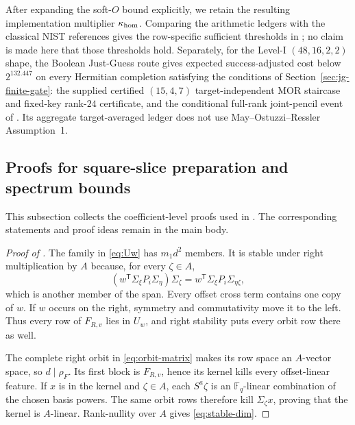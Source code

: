 \documentclass[11pt]{article}
\newcommand{\F}{\mathbb F}
\newcommand{\transpose}{\mathsf T}
\begin{document}
After expanding the soft-$O$ bound explicitly, we retain the resulting
implementation multiplier $\kappa_{\rm hom}$.  Comparing the arithmetic
ledgers with the classical NIST references gives
the row-specific sufficient thresholds in ; no claim is
made here that those thresholds hold.  Separately, for the Level-I $(48,16,2,2)$ shape, the Boolean Just-Guess
route gives expected success-adjusted cost below $2^{132.447}$ on every
Hermitian completion satisfying the conditions of Section~\ref{sec:jg-finite-gate}: the supplied certified $(15,4,7)$ target-independent MOR staircase and fixed-key rank-$24$ certificate,
and the conditional full-rank joint-pencil event of .  Its aggregate target-averaged ledger
does not use May--Ostuzzi--Ressler Assumption~1.

\subsection{Proofs for square-slice preparation and spectrum bounds}
\label{app:slice-proofs}

This subsection collects the coefficient-level proofs used in
.  The corresponding
statements and proof ideas remain in the main body.

\begin{proof}[Proof of ]
The family in \eqref{eq:Uw} has $m_1d^2$ members.  It is stable under right
multiplication by $A$ because, for every $\zeta\in A$,
\[
 (w^\transpose\Sigma_\xi P_i\Sigma_\eta)\Sigma_\zeta
 =w^\transpose\Sigma_\xi P_i\Sigma_{\eta\zeta},
\]
which is another member of the span.  Every offset cross term contains one
copy of $w$.  If $w$ occurs on the right, symmetry and commutativity move it to
the left.  Thus every row of $F_{R,v}$ lies in $U_w$, and right stability puts
every orbit row there as well.

The complete right orbit in \eqref{eq:orbit-matrix} makes its row space an
$A$-vector space, so $d\mid\rho_F$.  Its first block is $F_{R,v}$, hence its
kernel kills every offset-linear feature.  If $x$ is in the kernel and
$\zeta\in A$, each $S^a\zeta$ is an $\F_q$-linear combination of the chosen
basis powers.  The same orbit rows therefore kill $\Sigma_\zeta x$, proving
that the kernel is $A$-linear.  Rank-nullity over $A$ gives
\eqref{eq:stable-dim}.
\end{proof}
\end{document}
